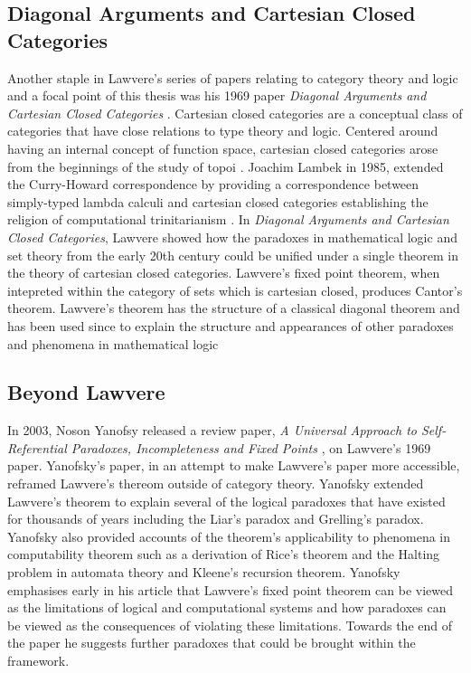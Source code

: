 \subsection{Diagonal Arguments and Cartesian Closed Categories}
Another staple in Lawvere's series of papers relating to category theory and
logic and a focal point of this thesis was his 1969 paper \textit{Diagonal
Arguments and Cartesian Closed Categories} \cite{lawvere1969diagonal}. Cartesian
closed categories are a conceptual class of categories that have close relations
to type theory and logic. Centered around having an internal concept of function
space, cartesian closed categories arose from the beginnings of the study of
topoi .
Joachim Lambek in 1985, extended the Curry-Howard correspondence by providing a
correspondence between simply-typed lambda calculi and cartesian closed
categories \cite{lambek1985cartesian} establishing the religion of computational
trinitarianism . In
\textit{Diagonal Arguments and Cartesian Closed Categories}, Lawvere showed how
the paradoxes in mathematical logic and set theory from the early 20th century
could be unified under a single theorem in the theory of cartesian closed
categories. Lawvere's fixed point theorem, when intepreted within the category
of sets which is cartesian closed, produces Cantor's theorem. Lawvere's theorem
has the structure of a classical diagonal theorem and has been used since to
explain the structure and appearances of other paradoxes and phenomena in
mathematical logic


\subsection{Beyond Lawvere}

In 2003, Noson Yanofsy released a review paper, \textit{A Universal Approach to
Self-Referential Paradoxes, Incompleteness and Fixed Points}
\cite{yanofsky2003universal}, on Lawvere's 1969
paper.  Yanofsky's paper, in an attempt to make Lawvere's paper more accessible,
reframed Lawvere's thereom outside of category theory. Yanofsky extended
Lawvere's theorem to explain several of the logical paradoxes that have existed
for thousands of years including the Liar's paradox and Grelling's paradox.
Yanofsky also provided accounts of the theorem's applicability to phenomena in
computability theorem such as a derivation of Rice's theorem  and the Halting
problem in automata theory and Kleene's recursion theorem. Yanofsky emphasises
early in his article that Lawvere's fixed point theorem can be viewed as the
limitations of logical and computational systems and how paradoxes can be viewed
as the consequences of violating these limitations. Towards the end of the paper
he suggests further paradoxes that could be brought within the framework.

